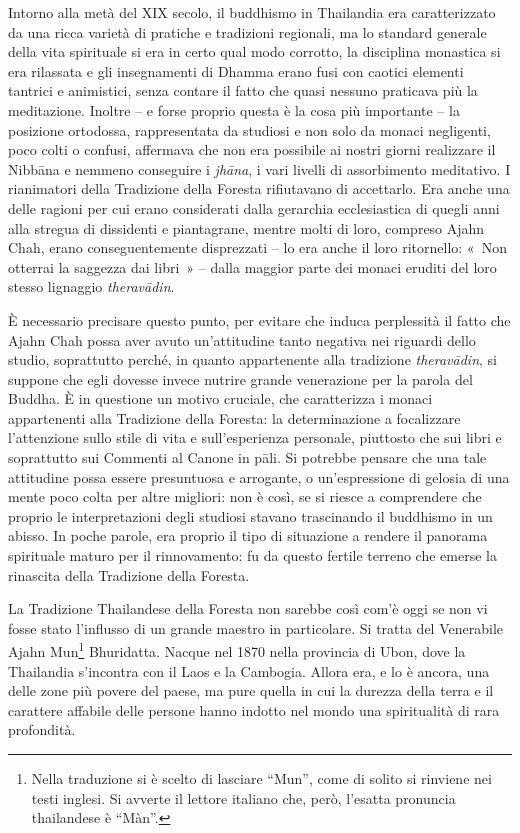 Intorno alla metà del XIX secolo, il buddhismo in Thailandia era
caratterizzato da una ricca varietà di pratiche e tradizioni regionali,
ma lo standard generale della vita spirituale si era in certo qual modo
corrotto, la disciplina monastica si era rilassata e gli insegnamenti di
Dhamma erano fusi con caotici elementi tantrici e animistici, senza
contare il fatto che quasi nessuno praticava più la meditazione. Inoltre
-- e forse proprio questa è la cosa più importante -- la posizione
ortodossa, rappresentata da studiosi e non solo da monaci negligenti,
poco colti o confusi, affermava che non era possibile ai nostri giorni
realizzare il Nibbāna e nemmeno conseguire i \emph{jhāna}, i vari
livelli di assorbimento meditativo. I rianimatori della Tradizione della
Foresta rifiutavano di accettarlo. Era anche una delle ragioni per cui
erano considerati dalla gerarchia ecclesiastica di quegli anni alla
stregua di dissidenti e piantagrane, mentre molti di loro, compreso
Ajahn Chah, erano conseguentemente disprezzati -- lo era anche il loro
ritornello: «~Non otterrai la saggezza dai libri~» -- dalla maggior
parte dei monaci eruditi del loro stesso lignaggio \emph{theravādin}.

È necessario precisare questo punto, per evitare che induca perplessità
il fatto che Ajahn Chah possa aver avuto un'attitudine tanto negativa
nei riguardi dello studio, soprattutto perché, in quanto appartenente
alla tradizione \emph{theravādin}, si suppone che egli dovesse invece
nutrire grande venerazione per la parola del Buddha. È in questione un
motivo cruciale, che caratterizza i monaci appartenenti alla Tradizione
della Foresta: la determinazione a focalizzare l'attenzione sullo stile
di vita e sull'esperienza personale, piuttosto che sui libri e
soprattutto sui Commenti al Canone in pāli. Si potrebbe pensare che una
tale attitudine possa essere presuntuosa e arrogante, o un'espressione
di gelosia di una mente poco colta per altre migliori: non è così, se si
riesce a comprendere che proprio le interpretazioni degli studiosi
stavano trascinando il buddhismo in un abisso. In poche parole, era
proprio il tipo di situazione a rendere il panorama spirituale maturo
per il rinnovamento: fu da questo fertile terreno che emerse la
rinascita della Tradizione della Foresta.

La Tradizione Thailandese della Foresta non sarebbe così com'è oggi se
non vi fosse stato l'influsso di un grande maestro in particolare. Si
tratta del Venerabile Ajahn Mun\footnote{Nella traduzione si è scelto di
  lasciare ``Mun'', come di solito si rinviene nei testi inglesi. Si
  avverte il lettore italiano che, però, l'esatta pronuncia thailandese
  è ``Màn''.} Bhuridatta. Nacque nel 1870 nella provincia di Ubon, dove
la Thailandia s'incontra con il Laos e la Cambogia. Allora era, e lo è
ancora, una delle zone più povere del paese, ma pure quella in cui la
durezza della terra e il carattere affabile delle persone hanno indotto
nel mondo una spiritualità di rara profondità.

